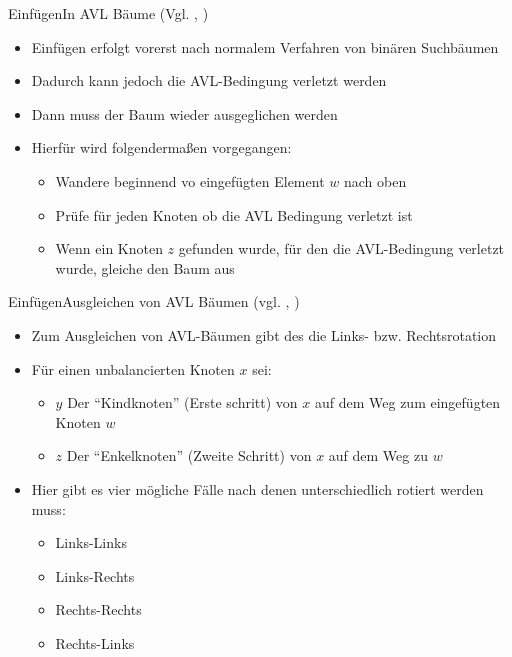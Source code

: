 \begin{frame}{Einfügen}{In AVL Bäume (Vgl. \cite{mutzel:avl}, \cite{wiki:avl})}
	\begin{itemize}
		\item Einfügen erfolgt vorerst nach normalem Verfahren von binären Suchbäumen
		\item Dadurch kann jedoch die AVL-Bedingung verletzt werden
		\item Dann muss der Baum wieder ausgeglichen werden
		\item Hierfür wird folgendermaßen vorgegangen:
		\begin{itemize}
			\item Wandere beginnend vo eingefügten Element $w$ nach oben
			\item Prüfe für jeden Knoten ob die AVL Bedingung verletzt ist
			\item Wenn ein Knoten $z$ gefunden wurde, für den die AVL-Bedingung verletzt wurde, gleiche den Baum aus
		\end{itemize}
	\end{itemize}
\end{frame}

\begin{frame}{Einfügen}{Ausgleichen von AVL Bäumen (vgl. \cite{avltree}, \cite{wiki:avl})}
	\begin{itemize}
		\item Zum Ausgleichen von AVL-Bäumen gibt des die Links- bzw. Rechtsrotation
		\item Für einen unbalancierten Knoten $x$ sei:
		\begin{itemize}
			\item $y$ Der "`Kindknoten"' (Erste schritt) von $x$ auf dem Weg zum eingefügten Knoten $w$
			\item $z$ Der "`Enkelknoten"' (Zweite Schritt) von $x$ auf dem Weg zu $w$
		\end{itemize}
		\item Hier gibt es vier mögliche Fälle nach denen unterschiedlich rotiert werden muss:
		\begin{itemize}
			\item Links-Links
			\item Links-Rechts
			\item Rechts-Rechts
			\item Rechts-Links
		\end{itemize}
	\end{itemize}
\end{frame}

